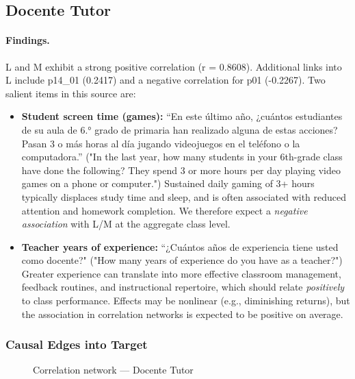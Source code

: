 \documentclass[11pt, a4paper]{article}
\begin{document}
\subsection{Docente Tutor}
\paragraph{Findings.}
L and M exhibit a strong positive correlation (r = 0.8608). Additional links into L include p14\_01 (0.2417) and a negative correlation for p01 (-0.2267). Two salient items in this source are:
\begin{itemize}
  \item \textbf{Student screen time (games):} ``En este último año, ¿cuántos estudiantes de su aula de 6.° grado de primaria han realizado alguna de estas acciones? Pasan 3 o más horas al día jugando videojuegos en el teléfono o la computadora.'' ("In the last year, how many students in your 6th-grade class have done the following? They spend 3 or more hours per day playing video games on a phone or computer.") Sustained daily gaming of 3+ hours typically displaces study time and sleep, and is often associated with reduced attention and homework completion. We therefore expect a \emph{negative association} with L/M at the aggregate class level.
  \item \textbf{Teacher years of experience:} ``¿Cuántos años de experiencia tiene usted como docente?" ("How many years of experience do you have as a teacher?") Greater experience can translate into more effective classroom management, feedback routines, and instructional repertoire, which should relate \emph{positively} to class performance. Effects may be nonlinear (e.g., diminishing returns), but the association in correlation networks is expected to be positive on average.
\end{itemize}

\subsubsection*{Causal Edges into Target}
\begin{figure}[h]
  \centering
  \caption{Correlation network — Docente Tutor}
\end{figure}
\end{document}
